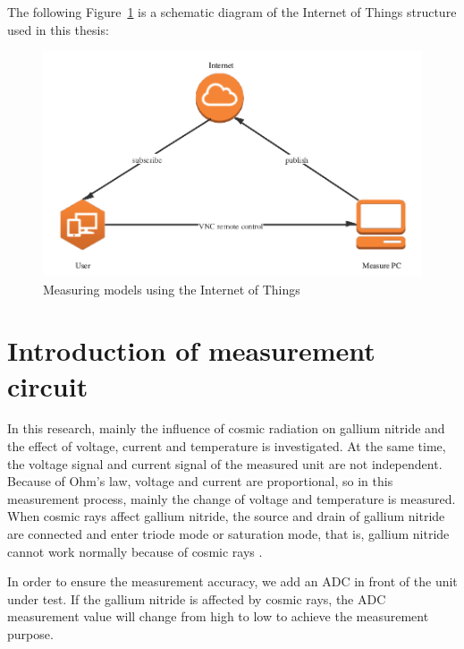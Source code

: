 The following Figure~\ref{fig:2.16} is a schematic diagram of the Internet of Things structure used in this thesis:
\begin{figure}[!ht]
	\centering
	\includegraphics[width=15cm]{grafiken/2.16.pdf}
	\caption{Measuring models using the Internet of Things} 
	\label{fig:2.16}
\end{figure}
\FloatBarrier

 
\chapter{Introduction of measurement circuit}
\label{chap:Introduction of measurement circuit}
In this research, mainly the influence of cosmic radiation on gallium nitride and the effect of voltage, current and temperature is investigated. At the same time, the voltage signal and current signal of the measured unit are not independent. Because of Ohm's law, voltage and current are proportional, so in this measurement process, mainly the change of voltage and temperature is measured. When cosmic rays affect gallium nitride, the source and drain of gallium nitride are connected and enter triode mode or saturation mode, that is, gallium nitride cannot work normally because of cosmic rays \cite{zhang2017physics}.

In order to ensure the measurement accuracy, we add an ADC in front of the unit under test. If the gallium nitride is affected by cosmic rays, the ADC measurement value will change from high to low to achieve the measurement purpose. 
\\
